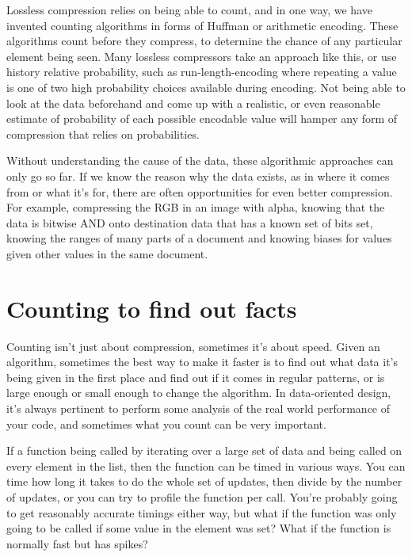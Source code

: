 Lossless compression relies on being able to count, and in one way, we have
invented counting algorithms in forms of Huffman or arithmetic encoding. These
algorithms count before they compress, to determine the chance of any
particular element being seen. Many lossless compressors take an approach like
this, or use history relative probability, such as run-length-encoding where
repeating a value is one of two high probability choices available during
encoding. Not being able to look at the data beforehand and come up with a
realistic, or even reasonable estimate of probability of each possible
encodable value will hamper any form of compression that relies on
probabilities.

Without understanding the cause of the data, these algorithmic approaches can
only go so far. If we know the reason why the data exists, as in where it comes
from or what it's for, there are often opportunities for even better
compression. For example, compressing the RGB in an image with alpha, knowing
that the data is bitwise AND onto destination data that has a known set of bits
set, knowing the ranges of many parts of a document and knowing biases for
values given other values in the same document.



\section{Counting to find out facts}

Counting isn't just about compression, sometimes it's about speed. Given an
algorithm, sometimes the best way to make it faster is to find out what data
it's being given in the first place and find out if it comes in regular
patterns, or is large enough or small enough to change the algorithm. In
data-oriented design, it's always pertinent to perform some analysis of the
real world performance of your code, and sometimes what you count can be
very important.

If a function being called by iterating over a large set of data and being
called on every element in the list, then the function can be timed in various
ways. You can time how long it takes to do the whole set of updates, then
divide by the number of updates, or you can try to profile the function per
call. You're probably going to get reasonably accurate timings either way, but
what if the function was only going to be called if some value in the element
was set? What if the function is normally fast but has spikes?

